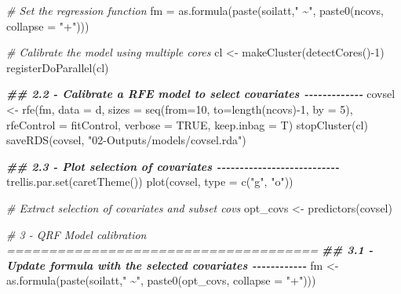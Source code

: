 \documentclass[
  10pt,
  b5paper,
  oneside]{book}
\newenvironment{Shaded}{\begin{snugshade}}{\end{snugshade}}
\newcommand{\AttributeTok}[1]{\textcolor[rgb]{0.77,0.63,0.00}{#1}}
\newcommand{\CommentTok}[1]{\textcolor[rgb]{0.56,0.35,0.01}{\textit{#1}}}
\newcommand{\ConstantTok}[1]{\textcolor[rgb]{0.00,0.00,0.00}{#1}}
\newcommand{\DecValTok}[1]{\textcolor[rgb]{0.00,0.00,0.81}{#1}}
\newcommand{\DocumentationTok}[1]{\textcolor[rgb]{0.56,0.35,0.01}{\textbf{\textit{#1}}}}
\newcommand{\FunctionTok}[1]{\textcolor[rgb]{0.00,0.00,0.00}{#1}}
\newcommand{\NormalTok}[1]{#1}
\newcommand{\OtherTok}[1]{\textcolor[rgb]{0.56,0.35,0.01}{#1}}
\newcommand{\SpecialCharTok}[1]{\textcolor[rgb]{0.00,0.00,0.00}{#1}}
\newcommand{\StringTok}[1]{\textcolor[rgb]{0.31,0.60,0.02}{#1}}
\begin{document}
\begin{Shaded}
\begin{Highlighting}[]
\CommentTok{\# Set the regression function}
\NormalTok{fm }\OtherTok{=} \FunctionTok{as.formula}\NormalTok{(}\FunctionTok{paste}\NormalTok{(soilatt,}\StringTok{" \textasciitilde{}"}\NormalTok{, }\FunctionTok{paste0}\NormalTok{(ncovs,}
                                             \AttributeTok{collapse =} \StringTok{"+"}\NormalTok{)))}

\CommentTok{\# Calibrate the model using multiple cores}
\NormalTok{cl }\OtherTok{\textless{}{-}} \FunctionTok{makeCluster}\NormalTok{(}\FunctionTok{detectCores}\NormalTok{()}\SpecialCharTok{{-}}\DecValTok{1}\NormalTok{)}
\FunctionTok{registerDoParallel}\NormalTok{(cl)}


\DocumentationTok{\#\# 2.2 {-} Calibrate a RFE model to select covariates {-}{-}{-}{-}{-}{-}{-}{-}{-}{-}{-}{-}{-}}
\NormalTok{covsel }\OtherTok{\textless{}{-}} \FunctionTok{rfe}\NormalTok{(fm,}
              \AttributeTok{data =}\NormalTok{ d,  }
              \AttributeTok{sizes =} \FunctionTok{seq}\NormalTok{(}\AttributeTok{from=}\DecValTok{10}\NormalTok{, }\AttributeTok{to=}\FunctionTok{length}\NormalTok{(ncovs)}\SpecialCharTok{{-}}\DecValTok{1}\NormalTok{, }\AttributeTok{by =} \DecValTok{5}\NormalTok{),}
              \AttributeTok{rfeControl =}\NormalTok{ fitControl,}
              \AttributeTok{verbose =} \ConstantTok{TRUE}\NormalTok{,}
              \AttributeTok{keep.inbag =}\NormalTok{ T)}
\FunctionTok{stopCluster}\NormalTok{(cl)}
\FunctionTok{saveRDS}\NormalTok{(covsel, }\StringTok{"02{-}Outputs/models/covsel.rda"}\NormalTok{)}

\DocumentationTok{\#\# 2.3 {-} Plot selection of covariates {-}{-}{-}{-}{-}{-}{-}{-}{-}{-}{-}{-}{-}{-}{-}{-}{-}{-}{-}{-}{-}{-}{-}{-}{-}{-}{-}}
\FunctionTok{trellis.par.set}\NormalTok{(}\FunctionTok{caretTheme}\NormalTok{())}
\FunctionTok{plot}\NormalTok{(covsel, }\AttributeTok{type =} \FunctionTok{c}\NormalTok{(}\StringTok{"g"}\NormalTok{, }\StringTok{"o"}\NormalTok{))}

\CommentTok{\# Extract selection of covariates and subset covs}
\NormalTok{opt\_covs }\OtherTok{\textless{}{-}} \FunctionTok{predictors}\NormalTok{(covsel)}

\CommentTok{\# 3 {-} QRF Model calibration =====================================}
\DocumentationTok{\#\# 3.1 {-} Update formula with the selected covariates {-}{-}{-}{-}{-}{-}{-}{-}{-}{-}{-}{-}}
\NormalTok{fm }\OtherTok{\textless{}{-}} \FunctionTok{as.formula}\NormalTok{(}\FunctionTok{paste}\NormalTok{(soilatt,}\StringTok{" \textasciitilde{}"}\NormalTok{,}
                       \FunctionTok{paste0}\NormalTok{(opt\_covs, }\AttributeTok{collapse =} \StringTok{"+"}\NormalTok{)))}


\end{Highlighting}
\end{Shaded}
\end{document}
